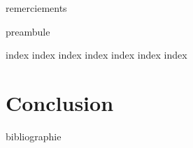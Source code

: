 


\frontmatter


\tableofcontents

\printglossary

{remerciements}

{preambule}

\mainmatter

{index}
{index}
{index}
{index}
{index}
{index}
{index}

\chapter{Conclusion}


\backmatter

{bibliographie}


\newcommand\listfigurenameappendixes{\listfigurename}
\newcommand\listtablenameappendixes{\listtablename}

